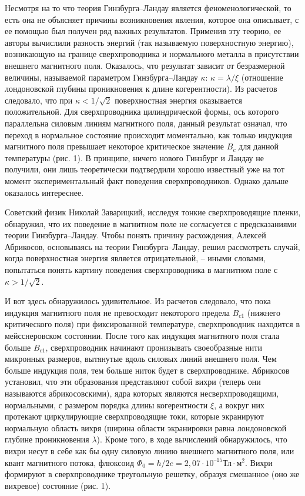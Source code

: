 Несмотря на то что теория Гинзбурга–Ландау является феноменологической, то 
есть она не объясняет причины возникновения явления, которое она описывает, с 
ее помощью был получен ряд важных результатов. Применив эту теорию, ее авторы 
вычислили разность энергий (так называемую поверхностную энергию), 
возникающую на границе сверхпроводника и нормального металла в присутствии 
внешнего магнитного поля. Оказалось, что результат зависит от безразмерной 
величины, называемой параметром Гинзбурга–Ландау \( \kappa \): 
\( \kappa = \lambda/\xi \) (отношение лондоновской глубины проникновения к 
длине когерентности). Из расчетов следовало, что при \( \kappa < 1/\sqrt{2} \) 
поверхностная энергия оказывается положительной. Для сверхпроводника 
цилиндрической формы, ось которого параллельна силовым линиям магнитного поля, 
данный результат означал, что переход в нормальное состояние происходит 
моментально, как только индукция магнитного поля превышает некоторое 
критическое значение \( B_c \) для данной температуры (рис. 1). В принципе, 
ничего нового Гинзбург и Ландау не получили, они лишь теоретически подтвердили 
хорошо известный уже на тот момент экспериментальный факт поведения 
сверхпроводников. Однако дальше оказалось интереснее.

Советский физик Николай Заварицкий, исследуя тонкие сверхпроводящие пленки, 
обнаружил, что их поведение в магнитном поле не согласуется с предсказаниями 
теории Гинзбурга–Ландау. Чтобы понять причину расхождения, Алексей Абрикосов, 
основываясь на теории Гинзбурга–Ландау, решил рассмотреть случай, когда 
поверхностная энергия является отрицательной, -- иными словами, попытаться 
понять картину поведения сверхпроводника в магнитном поле с 
\( \kappa > 1/\sqrt{2} \).

И вот здесь обнаружилось удивительное. Из расчетов следовало, что пока 
индукция магнитного поля не превосходит некоторого предела \( B_{c1} \) 
(нижнего критического поля) при фиксированной температуре, сверхпроводник 
находится в мейсснеровском состоянии. После того как индукция магнитного поля 
стала больше \( B_{c1} \), сверхпроводник начинают пронизывать своеобразные 
нити микронных размеров, вытянутые вдоль силовых линий внешнего поля. Чем 
больше индукция поля, тем больше ниток будет в сверхпроводнике. Абрикосов 
установил, что эти образования представляют собой вихри (теперь они называются 
абрикосовскими), ядра которых являются несверхпроводящими, нормальными, с 
размером порядка длины когерентности \( \xi \), а вокруг них протекают 
циркулирующие сверхпроводящие токи, которые экранируют нормальную область 
вихря (ширина области экранировки равна лондоновской глубине проникновения 
\( \lambda \)). Кроме того, в ходе вычислений обнаружилось, что вихри несут в 
себе как бы одну силовую линию внешнего магнитного поля, или квант магнитного 
потока, флюксоид \( \Phi_0 = h/2e = 2,07\cdot10^{–15} \text{Тл}\cdot{м}^2 \). 
Вихри формируют в сверхпроводнике треугольную решетку, образуя смешанное 
(оно же вихревое) состояние (рис. 1).

